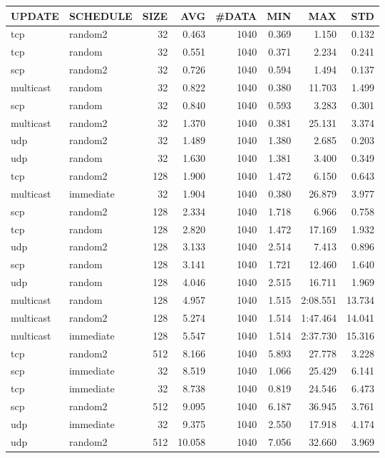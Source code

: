 \begin{tabular}{|l|l|r|r|r|r|r|r|}
\hline
UPDATE & SCHEDULE & SIZE & AVG & \#DATA & MIN & MAX & STD\\
\hline
tcp & random2 & 32 &  0.463 & 1040 & 0.369 & 1.150 & 0.132\\
tcp & random & 32 &  0.551 & 1040 & 0.371 & 2.234 & 0.241\\
scp & random2 & 32 &  0.726 & 1040 & 0.594 & 1.494 & 0.137\\
multicast & random & 32 &  0.822 & 1040 & 0.380 & 11.703 & 1.499\\
scp & random & 32 &  0.840 & 1040 & 0.593 & 3.283 & 0.301\\
multicast & random2 & 32 &  1.370 & 1040 & 0.381 & 25.131 & 3.374\\
udp & random2 & 32 &  1.489 & 1040 & 1.380 & 2.685 & 0.203\\
udp & random & 32 &  1.630 & 1040 & 1.381 & 3.400 & 0.349\\
tcp & random2 & 128 &  1.900 & 1040 & 1.472 & 6.150 & 0.643\\
multicast & immediate & 32 &  1.904 & 1040 & 0.380 & 26.879 & 3.977\\
scp & random2 & 128 &  2.334 & 1040 & 1.718 & 6.966 & 0.758\\
tcp & random & 128 &  2.820 & 1040 & 1.472 & 17.169 & 1.932\\
udp & random2 & 128 &  3.133 & 1040 & 2.514 & 7.413 & 0.896\\
scp & random & 128 &  3.141 & 1040 & 1.721 & 12.460 & 1.640\\
udp & random & 128 &  4.046 & 1040 & 2.515 & 16.711 & 1.969\\
multicast & random & 128 &  4.957 & 1040 & 1.515 & 2:08.551 & 13.734\\
multicast & random2 & 128 &  5.274 & 1040 & 1.514 & 1:47.464 & 14.041\\
multicast & immediate & 128 &  5.547 & 1040 & 1.514 & 2:37.730 & 15.316\\
tcp & random2 & 512 &  8.166 & 1040 & 5.893 & 27.778 & 3.228\\
scp & immediate & 32 &  8.519 & 1040 & 1.066 & 25.429 & 6.141\\
tcp & immediate & 32 &  8.738 & 1040 & 0.819 & 24.546 & 6.473\\
scp & random2 & 512 &  9.095 & 1040 & 6.187 & 36.945 & 3.761\\
udp & immediate & 32 &  9.375 & 1040 & 2.550 & 17.918 & 4.174\\
udp & random2 & 512 &  10.058 & 1040 & 7.056 & 32.660 & 3.969\\

\end{tabular}
